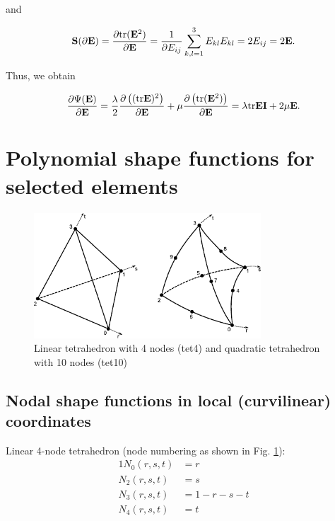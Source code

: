 and

 \begin{equation}
 \mathbf {S}  (\partial \mathbf {E} ) = \frac{\partial \textnormal{tr}  (\mathbf {E} ^2)}{\partial \mathbf {E} } = \frac{1}{\partial E_{ij}} \sum_{k,l=1} ^3 E_{kl} E_{kl} = 2 E_{ij} = 2 \mathbf {E} .
\end{equation}

Thus, we obtain

 \begin{equation}
\frac{ \partial \Psi  (\mathbf {E}  )}{\partial \mathbf {E} } = \frac{\lambda}{2} \frac{ \partial \left( (\textnormal{tr}  \mathbf {E} )^2 \right)}{\partial \mathbf {E}  } + \mu \frac{ \partial \left( \textnormal{tr}  (\mathbf {E} ^2) \right) }{\partial \mathbf {E} } = \lambda \textnormal{tr} {\ensuremath{\mathbf {E} }}  \mathbf {I } + 2 \mu \mathbf {E} .
\end{equation}

\section{Polynomial shape functions for selected elements} 
\label{AShapeFunctions}

\begin{figure}
   \centering   
\includegraphics[width=8.5cm]{Figures/Tet4and10.pdf}
\caption{Linear tetrahedron with 4 nodes (tet4) and quadratic tetrahedron with 10 nodes (tet10)}
\label{TetraAppendix}
\end{figure}

\subsection{Nodal shape functions in local (curvilinear) coordinates}
Linear 4-node tetrahedron (node numbering as shown in Fig. \ref{TetraAppendix}):
\begin{alignat}{1}
N_0(r,s,t) &= r\\ 
N_2(r,s,t) &= s\\
N_3(r,s,t) &= 1-r-s-t\\
N_4(r,s,t) &= t\\
\end{alignat}

